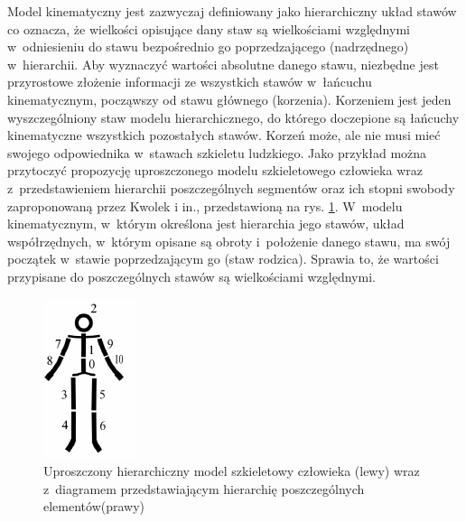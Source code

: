 Model kinematyczny jest zazwyczaj definiowany jako hierarchiczny układ stawów co oznacza, że wielkości opisujące dany staw są wielkościami względnymi w~odniesieniu do stawu bezpośrednio go poprzedzającego (nadrzędnego) w~hierarchii. Aby wyznaczyć wartości absolutne danego stawu, niezbędne jest przyrostowe złożenie informacji ze wszystkich stawów w~łańcuchu kinematycznym, począwszy od stawu głównego (korzenia). Korzeniem jest jeden wyszczególniony staw modelu hierarchicznego, do którego doczepione są łańcuchy kinematyczne wszystkich pozostałych stawów. Korzeń może, ale nie musi mieć swojego odpowiednika w~stawach szkieletu ludzkiego. Jako przykład można przytoczyć propozycję uproszczonego modelu szkieletowego człowieka wraz z~przedstawieniem hierarchii poszczególnych segmentów oraz ich stopni swobody zaproponowaną przez Kwolek i in.\cite{Kwolek2014}, przedstawioną na rys. \ref{fig:literature:skeletonModelHierarchy}. W~modelu kinematycznym, w~którym określona jest hierarchia jego stawów, układ współrzędnych, w~którym opisane są obroty i~położenie danego stawu, ma swój początek w~stawie poprzedzającym go (staw rodzica). Sprawia to, że wartości przypisane do poszczególnych stawów są wielkościami względnymi.
											
\begin{savenotes}
	\begin{figure}[!htb]
		\centering
		\begin{minipage}{.18\textwidth}
			\centering
			\includegraphics{images/hierarchical-structure.png}       
		\end{minipage}%
		\hfill
		\begin{minipage}{0.75\textwidth}
			\centering
			\scalebox{0.73}{
				
			}
		\end{minipage}
		\caption[Uproszczony hierarchiczny model szkieletowy człowieka wraz z~diagramem przedstawiającym hierarchię poszczególnych elementów]{Uproszczony hierarchiczny model szkieletowy człowieka (lewy) wraz z~diagramem przedstawiającym hierarchię poszczególnych elementów(prawy) \cite{Kwolek2014}}
		\label{fig:literature:skeletonModelHierarchy}
	\end{figure}
\end{savenotes}
													
